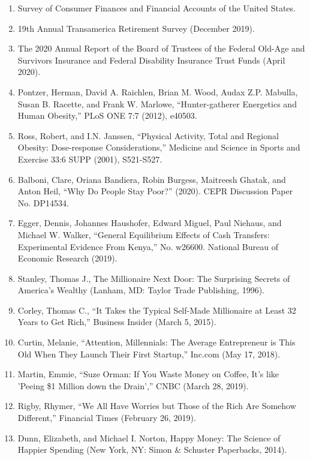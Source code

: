 \begin{enumerate}
\item\hypertarget{endnote:14}{} Survey of Consumer Finances and Financial Accounts of the United States.
\item\hypertarget{endnote:15}{} 19th Annual Transamerica Retirement Survey (December 2019).
\item\hypertarget{endnote:16}{} The 2020 Annual Report of the Board of Trustees of the Federal Old-Age and Survivors Insurance and Federal Disability Insurance Trust Funds (April 2020).
\item\hypertarget{endnote:17}{} Pontzer, Herman, David A. Raichlen, Brian M. Wood, Audax Z.P. Mabulla, Susan B. Racette, and Frank W. Marlowe, “Hunter-gatherer Energetics and Human Obesity,” PLoS ONE 7:7 (2012), e40503.
\item\hypertarget{endnote:18}{} Ross, Robert, and I.N. Janssen, “Physical Activity, Total and Regional Obesity: Dose-response Considerations,” Medicine and Science in Sports and Exercise 33:6 SUPP (2001), S521-S527.
\item\hypertarget{endnote:19}{} Balboni, Clare, Oriana Bandiera, Robin Burgess, Maitreesh Ghatak, and Anton Heil, “Why Do People Stay Poor?” (2020). CEPR Discussion Paper No. DP14534.
\item\hypertarget{endnote:20}{} Egger, Dennis, Johannes Haushofer, Edward Miguel, Paul Niehaus, and Michael W. Walker, “General Equilibrium Effects of Cash Transfers: Experimental Evidence From Kenya,” No. w26600. National Bureau of Economic Research (2019).
\item\hypertarget{endnote:21}{} Stanley, Thomas J., The Millionaire Next Door: The Surprising Secrets of America's Wealthy (Lanham, MD: Taylor Trade Publishing, 1996).
\item\hypertarget{endnote:22}{} Corley, Thomas C., “It Takes the Typical Self-Made Millionaire at Least 32 Years to Get Rich,” Business Insider (March 5, 2015).
\item\hypertarget{endnote:23}{} Curtin, Melanie, “Attention, Millennials: The Average Entrepreneur is This Old When They Launch Their First Startup,” Inc.com (May 17, 2018).
\item\hypertarget{endnote:24}{} Martin, Emmie, “Suze Orman: If You Waste Money on Coffee, It's like 'Peeing \$1 Million down the Drain',” CNBC (March 28, 2019).
\item\hypertarget{endnote:25}{} Rigby, Rhymer, “We All Have Worries but Those of the Rich Are Somehow Different,” Financial Times (February 26, 2019).
\item\hypertarget{endnote:26}{} Dunn, Elizabeth, and Michael I. Norton, Happy Money: The Science of Happier Spending (New York, NY: Simon \& Schuster Paperbacks, 2014).

\end{enumerate}
